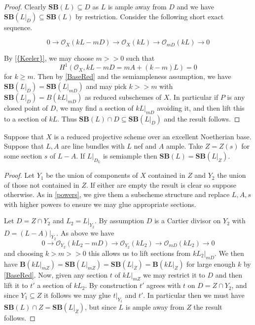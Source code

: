 \documentclass[a4paper,12pt]{book}
\newcommand{\SB}{\mathbf{SB}}
\newcommand{\BB}{\mathbf{B}}
\newcommand{\ox}[1][X]{\mathcal{O}_{#1}}
\begin{document}
\begin{proof}
	Clearly $\SB(L) \subseteq D$ as $L$ is ample away from $D$ and we have $\SB(L|_{D}) \subseteq \SB(L)$ by restriction. Consider the following short exact sequence.
	
	\[0 \to \ox (kL-mD) \to \ox(kL) \to \ox[mD](kL) \to 0\]
	
	By \autoref{{Keeler}}, we may choose $m >>0$ such that $$H^{1}(\ox,kL-mD=mA+(k-m)L)=0$$ for $k \geq m$. Then by \autoref{BaseRed} and the semiampleness assumption, we have $\SB(L|_{D})=\SB(L|_{mD})$ and may pick $k>> m$ with $\SB(L|_{D})=B(kL|_{mD})$ as reduced subschemes of $X$. In particular if $P$ is any closed point of $D$, we may find a section of $kL|_{mD}$ avoiding it, and then lift this to a section of $kL$. Thus $\SB(L)\cap D \subseteq \SB(L|_{D}) $ and the result follows.

\end{proof}


\begin{lemma}
	Suppose that $X$ is a reduced projective scheme over an excellent Noetherian base. Suppose that $L,A$ are line bundles with $L$ nef and $A$ ample. Take $Z=Z(s)$ for some section $s$ of $L-A$. If $L|_{D_{\mathbb{Q}}}$ is semiample then $\SB(L)=\SB(L|_{Z})$.
\end{lemma}

\begin{proof}
	Let $Y_{1}$ be the union of components of $X$ contained in $Z$ and $Y_{2}$ the union of those not contained in $Z$. If either are empty the result is clear so suppose otherwise. As in \autoref{powers}, we give them a subscheme structure and replace $L,A,s$ with higher powers to ensure we may glue appropriate sections.
	
	Let $D=Z \cap Y_{2}$ and $L_{2}=L|_{Y_{2}}$. By assumption $D$ is a Cartier divisor on $Y_{2}$ with $D=(L-A)|_{Y_{2}}$. As above we have 
	\[0 \to \ox[Y_{2}] (kL_{2}-mD) \to \ox[Y_{2}](kL_{2}) \to \ox[mD](kL_{2}) \to 0\]
	and choosing $k > m >>0$ this allows us to lift sections from $kL_{2}|_{mD}$. We then have $\BB(kL|_{mZ})=\SB(L|_{mZ})=\SB(L|_{Z})= \BB(kL|_{Z})$ for large enough $k$ by \autoref{BaseRed}. Now, given any section $t$ of $kL|_{mZ}$ we may restrict it to $D$ and then lift it to $t'$ a section of $kL_{2}$. By construction $t'$ agrees with $t$ on $D=Z \cap Y_{2}$, and since $Y_{1} \subseteq Z$ it follows we may glue $t|_{Y_{1}}$ and $t'$. In particular then we must have $\SB(L)\cap Z = \SB(L|_{Z})$, but since $L$ is ample away from $Z$ the result follows.
\end{proof}
\end{document}
